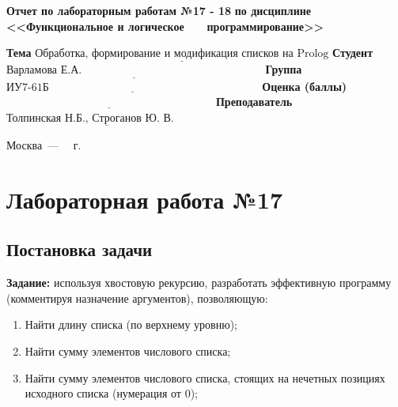 \documentclass[12pt]{report}
\begin{document}
\begin{titlepage}
		\begin{center}
			\noindent\begin{minipage}{1.1\textwidth}\centering
				\Large\textbf{  Отчет по лабораторным работам №17 - 18}\newline
				\textbf{по дисциплине <<Функциональное и логическое}\newline
				\textbf{~~~программирование>>}\newline\newline
			\end{minipage}
		\end{center}
		
		\noindent\textbf{Тема} $\underline{\text{Обработка, формирование и модификация списков на Prolog}}$\newline\newline
		\noindent\textbf{Студент} $\underline{\text{Варламова Е.А.~~~~~~~~~~~~~~~~~~~~~~~~~~~~~~~~~~~~~~~~~~~~~~~~~}}$\newline\newline
		\noindent\textbf{Группа} $\underline{\text{ИУ7-61Б~~~~~~~~~~~~~~~~~~~~~~~~~~~~~~~~~~~~~~~~~~~~~~~~~~~~~~~~~}}$\newline\newline
		\noindent\textbf{Оценка (баллы)} $\underline{\text{~~~~~~~~~~~~~~~~~~~~~~~~~~~~~~~~~~~~~~~~~~~~~~~~~~~~~~~~}}$\newline\newline
		\noindent\textbf{Преподаватель} $\underline{\text{Толпинская Н.Б., Строганов Ю. В.~~~~~~~~~}}$\newline\newline\newline
		
		\begin{center}
			\vfill
			Москва~---~\the\year
			~г.
		\end{center}
	\end{titlepage}
	

\chapter*{Лабораторная работа №17}
\section*{Постановка задачи}

\textbf{Задание:} используя хвостовую рекурсию, разработать эффективную программу (комментируя назначение аргументов), позволяющую:
\begin{enumerate}
	\item Найти длину списка (по верхнему уровню);
	\item Найти сумму элементов числового списка;
	\item Найти сумму элементов числового списка, стоящих на нечетных позициях исходного списка (нумерация от 0);
\end{enumerate}
\end{document}
